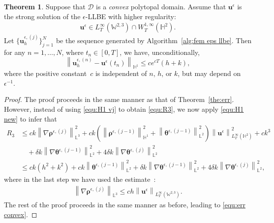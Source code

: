 \documentclass[11pt,reqno]{amsart}
\theoremstyle{definition}
\newtheorem{theorem}{Theorem}[section]
\numberwithin{equation}{section}
\newcommand{\bff}{\boldsymbol}
\newcommand{\bb}{\mathbb}
\newcommand{\norm}[2]{\left\|{#1}\right\|_{#2}}
\begin{document}
{
\begin{theorem}\label{rem:error}
Suppose that $\mathscr{D}$ is a \emph{convex} polytopal domain. Assume that $\bff{u}^\epsilon$ is the strong solution of the $\epsilon$-LLBE with higher regularity:
\begin{align*}
	\bff{u}^\epsilon \in L^\infty_T(\bb{W}^{2,3}) \cap W^{1,\infty}_T(\bb{H}^2).
\end{align*}
Let $\big\{\bff{u}_h^{\epsilon, (j)}\big\}_{j=1}^N$ be the sequence generated by Algorithm~\ref{alg:fem eps llbe}.
Then for any $n=1,\ldots,N$, where $t_n\in [0,T]$, we have, unconditionally,
\begin{equation}\label{equ:err convex}
 \norm{\bff{u}_h^{\epsilon, (n)}-\bff{u}^\epsilon(t_n)}{\bb{H}^1}
 \leq c e^{cT} (h+k),
\end{equation}
where the positive constant~$c$ is independent of $n$, $h$, or $k$, but may depend on $\epsilon^{-1}$.
\end{theorem}

\begin{proof}
The proof proceeds in the same manner as that of Theorem~\ref{the:err}. However, instead of using \eqref{equ:H1 vj} to obtain \eqref{equ:R3}, we now apply \eqref{equ:H1 new} to infer that
\begin{align*}
    R_3 &\leq
    ck \norm{\nabla \bff{\rho}^{\epsilon, (j)}}{\bb{L}^3}^2 + ck \left(\norm{\bff{\rho}^{\epsilon, (j-1)}}{\bb{H}^1}^2 + \norm{\bff{\theta}^{\epsilon, (j-1)}}{\bb{L}^2}^2 \right) \norm{\bff{u}^\epsilon}{L^\infty_T(\bb{H}^2)}^2
    +
    ck^3 
    \\
    &\quad
    + \delta k \norm{\nabla \bff{\theta}^{\epsilon, (j-1)}}{\bb{L}^2}^2
	+ 4\delta k \norm{\nabla \bff{\theta}^{\epsilon, (j)}}{\bb{L}^2}^2
    \\
    &\leq
    ck(h^2+k^2) + ck \norm{\bff{\theta}^{\epsilon, (j-1)}}{\bb{L}^2}^2
    + \delta k \norm{\nabla \bff{\theta}^{\epsilon, (j-1)}}{\bb{L}^2}^2
	+ 4\delta k \norm{\nabla \bff{\theta}^{\epsilon, (j)}}{\bb{L}^2}^2,
\end{align*}
where in the last step we have used the estimate~\citep{CroTho87}:
\begin{align*}
	\norm{\nabla \bff{\rho}^{\epsilon, (j)}}{\bb{L}^3} \leq ch \norm{\bff{u}^\epsilon}{L^\infty_T(\bb{W}^{2,3})}.
\end{align*}
The rest of the proof proceeds in the same manner as before, leading to \eqref{equ:err convex}.
\end{proof}
}
\end{document}
